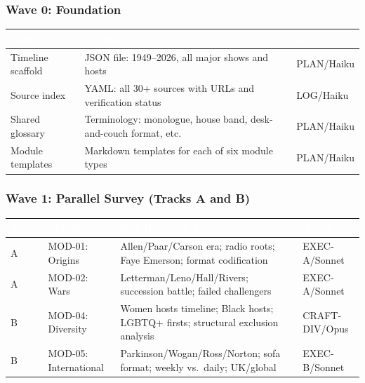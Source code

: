 \documentclass[11pt,letterpaper]{article}
\newcommand{\tableheader}[1]{\textbf{\sffamily\textcolor{white}{#1}}}
\begin{document}
\subsubsection{Wave 0: Foundation}

\begin{center}
\begin{tabularx}{\textwidth}{L{2cm}XC{2cm}}
\toprule
{}
\tableheader{Task} & \tableheader{Output} & \tableheader{Agent} \\
\midrule
Timeline scaffold & JSON file: 1949--2026, all major shows and hosts & PLAN/Haiku \\
Source index & YAML: all 30+ sources with URLs and verification status & LOG/Haiku \\
Shared glossary & Terminology: monologue, house band, desk-and-couch format, etc. & PLAN/Haiku \\
Module templates & Markdown templates for each of six module types & PLAN/Haiku \\
\bottomrule
\end{tabularx}
\end{center}

\subsubsection{Wave 1: Parallel Survey (Tracks A and B)}

\begin{center}
\begin{tabularx}{\textwidth}{L{1.5cm}L{2cm}XC{2cm}}
\toprule
{}
\tableheader{Track} & \tableheader{Module} & \tableheader{Key Research Tasks} & \tableheader{Agent} \\
\midrule
A & MOD-01: Origins & Allen/Paar/Carson era; radio roots; Faye Emerson; format codification & EXEC-A/Sonnet \\
A & MOD-02: Wars & Letterman/Leno/Hall/Rivers; succession battle; failed challengers & EXEC-A/Sonnet \\
B & MOD-04: Diversity & Women hosts timeline; Black hosts; LGBTQ+ firsts; structural exclusion analysis & CRAFT-DIV/Opus \\
B & MOD-05: International & Parkinson/Wogan/Ross/Norton; sofa format; weekly vs.\ daily; UK/global & EXEC-B/Sonnet \\
\bottomrule
\end{tabularx}
\end{center}
\end{document}
